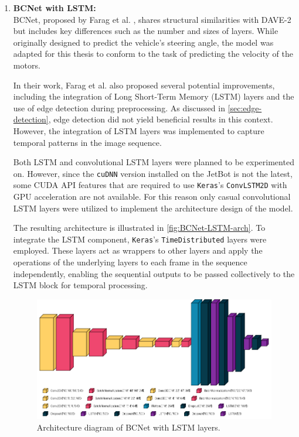 \begin{enumerate}
  \item \textbf{BCNet with LSTM:} \\
    BCNet, proposed by Farag et al. \autocite{8855753}, shares structural similarities with DAVE-2 but includes key differences such as the number and sizes of layers. While originally designed to predict the vehicle’s steering angle, the model was adapted for this thesis to conform to the task of predicting the velocity of the motors.

    In their work, Farag et al. also proposed several potential improvements, including the integration of Long Short-Term Memory (LSTM) layers and the use of edge detection during preprocessing. As discussed in \autoref{sec:edge-detection}, edge detection did not yield beneficial results in this context. However, the integration of LSTM layers was implemented to capture temporal patterns in the image sequence.

    Both LSTM and convolutional LSTM layers were planned to be experimented on. However, since the \texttt{cuDNN} version installed on the JetBot is not the latest, some CUDA API features that are required to use \texttt{Keras}’s \texttt{ConvLSTM2D} with GPU acceleration are not available. For this reason only casual convolutional LSTM layers were utilized to implement the architecture design of the model.

    The resulting architecture is illustrated in \autoref{fig:BCNet-LSTM-arch}. To integrate the LSTM component, \texttt{Keras}’s \texttt{TimeDistributed} layers were employed. These layers act as wrappers to other layers and apply the operations of the underlying layers to each frame in the sequence independently, enabling the sequential outputs to be passed collectively to the LSTM block for temporal processing.

    \begin{figure}[htbp]
      \centering
      \includegraphics[width=1.0\textwidth]{Images/BCNetLSTM_architecture.png}
      \caption{Architecture diagram of BCNet with LSTM layers.}
      \label{fig:BCNet-LSTM-arch}
    \end{figure}
\end{enumerate}

